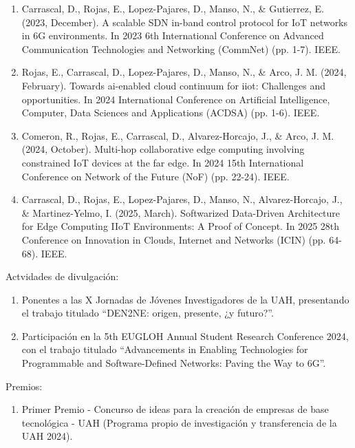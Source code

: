 \begin{enumerate}
    \item Carrascal, D., Rojas, E., Lopez-Pajares, D., Manso, N., \& Gutierrez, E. (2023, December). A scalable SDN in-band control protocol for IoT networks in 6G environments. In 2023 6th International Conference on Advanced Communication Technologies and Networking (CommNet) (pp. 1-7). IEEE.
    
    \item Rojas, E., Carrascal, D., Lopez-Pajares, D., Manso, N., \& Arco, J. M. (2024, February). Towards ai-enabled cloud continuum for iiot: Challenges and opportunities. In 2024 International Conference on Artificial Intelligence, Computer, Data Sciences and Applications (ACDSA) (pp. 1-6). IEEE.
    
    \item Comeron, R., Rojas, E., Carrascal, D., Alvarez-Horcajo, J., \& Arco, J. M. (2024, October). Multi-hop collaborative edge computing involving constrained IoT devices at the far edge. In 2024 15th International Conference on Network of the Future (NoF) (pp. 22-24). IEEE.
 
    \item Carrascal, D., Rojas, E., Lopez-Pajares, D., Manso, N., Alvarez-Horcajo, J., \& Martinez-Yelmo, I. (2025, March). Softwarized Data-Driven Architecture for Edge Computing IIoT Environments: A Proof of Concept. In 2025 28th Conference on Innovation in Clouds, Internet and Networks (ICIN) (pp. 64-68). IEEE.
    
\end{enumerate}

Actvidades de divulgación:

\begin{enumerate}
    \item Ponentes a las X Jornadas de Jóvenes Investigadores de la UAH, presentando el trabajo titulado ``DEN2NE: origen, presente, ¿y futuro?''.
    
    \item Participación en la 5th EUGLOH Annual Student Research Conference 2024, con el trabajo titulado ``Advancements in Enabling Technologies for Programmable and Software-Defined Networks: Paving the Way to 6G''.
\end{enumerate}

Premios:

\begin{enumerate}
    \item Primer Premio - Concurso de ideas para la creación de empresas de base tecnológica - UAH (Programa propio de investigación y transferencia de la UAH 2024).
\end{enumerate}

